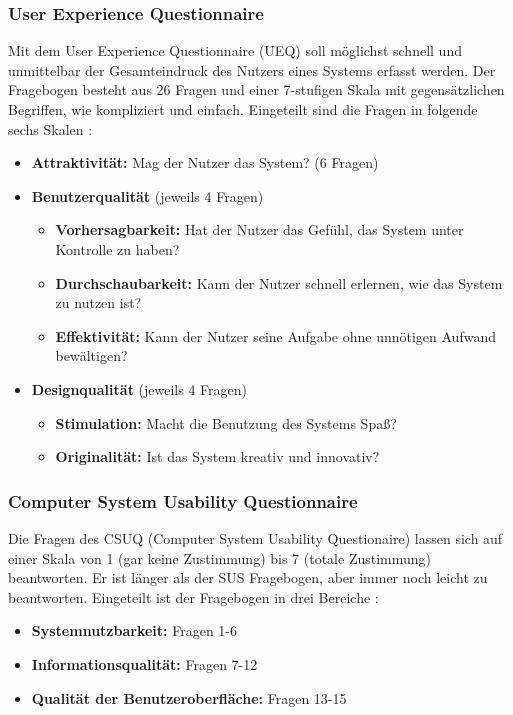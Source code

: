 \subsubsection*{User Experience Questionnaire}
Mit dem User Experience Questionnaire (UEQ) soll möglichst schnell und unmittelbar der Gesamteindruck des Nutzers eines Systems erfasst werden. Der Fragebogen besteht aus 26 Fragen und einer 7-stufigen Skala mit gegensätzlichen Begriffen, wie kompliziert und einfach. Eingeteilt sind die Fragen in folgende sechs Skalen \cite{Schrepp2015}:
\begin{itemize}
\item \textbf{Attraktivität:} Mag der Nutzer das System? (6 Fragen)
\item \textbf{Benutzerqualität} (jeweils 4 Fragen)
	\begin{itemize}
	\item \textbf{Vorhersagbarkeit:} Hat der Nutzer das Gefühl, das System unter Kontrolle zu haben?
	\item \textbf{Durchschaubarkeit:} Kann der Nutzer schnell erlernen, wie das System zu nutzen ist?
	\item \textbf{Effektivität:} Kann der Nutzer seine Aufgabe ohne unnötigen Aufwand bewältigen?
	\end{itemize}
\item \textbf{Designqualität} (jeweils 4 Fragen)
	\begin{itemize}
	\item \textbf{Stimulation:} Macht die Benutzung des Systems Spaß?
	\item \textbf{Originalität:} Ist das System kreativ und innovativ?
	\end{itemize}
\end{itemize}

\subsubsection*{Computer System Usability Questionnaire}
Die Fragen des CSUQ (Computer System Usability Questionaire) lassen sich auf einer Skala von 1 (gar keine Zustimmung) bis 7 (totale Zustimmung) beantworten. Er ist länger als der SUS Fragebogen, aber immer noch leicht zu beantworten. Eingeteilt ist der Fragebogen in drei Bereiche \cite{Lewis2018}:
\begin{itemize}
\item \textbf{Systemnutzbarkeit:} Fragen 1-6
\item \textbf{Informationsqualität:} Fragen 7-12
\item \textbf{Qualität der Benutzeroberfläche:} Fragen 13-15
\end{itemize}

